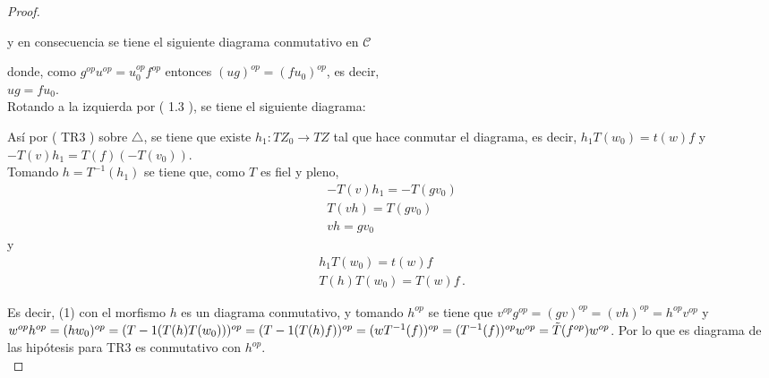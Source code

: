 \documentclass{article}
\begin{document}
\begin{enumerate}
\begin{proof}
\centerline{
}
y en consecuencia se tiene el siguiente diagrama conmutativo en $\mathscr{C}$ \\

\centerline{
}

donde, como $g^{op}u^{op}=u_0^{op}f^{op}$ entonces $(ug)^{op}=(fu_0)^{op}$, es decir, \\$ug=fu_0$.\\

Rotando a la izquierda por ( 1.3 ), se tiene el siguiente diagrama:\\
\centerline{
}
Así por ( TR3 ) sobre $\triangle$, se tiene que existe $h_1:TZ_0\to TZ$ tal que hace conmutar el diagrama, es decir, $h_1T(w_0)=t(w)f$ y \\
$-T(v)h_1=T(f)(-T(v_0))$.\\

Tomando $h=T^{-1}(h_1)$ se tiene que, como $T$ es fiel y pleno,
\begin{gather*}
-T(v)h_1=-T(gv_0)\\
T(vh)=T(gv_0)\\
vh=gv_0
\end{gather*}
y
\begin{gather*}
h_1T(w_0)=t(w)f\\
T(h)T(w_0)=T(w)f\,.
\end{gather*}

Es decir, (1) con el morfismo $h$ es un diagrama conmutativo, y tomando $h^{op}$ se tiene que $v^{op}g^{op}=(gv)^{op}=(vh)^{op}=h^{op}v^{op}$
y \\ $w^{op}h^{op}=(hw_0)^{op}=(T-1(T(h)T(w_0)))^{op}=(T-1(T(h)f))^{op}=(wT^{-1}(f))^{op}\\
=(T^{-1}(f))^{op}w^{op}=\tilde{T}(f^{op})w^{op}$.
Por lo que es diagrama de las hipótesis para TR3 es conmutativo con $h^{op}$.\\


\end{proof}
\end{enumerate}
\end{document}
